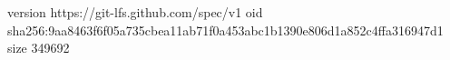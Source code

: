 version https://git-lfs.github.com/spec/v1
oid sha256:9aa8463f6f05a735cbea11ab71f0a453abc1b1390e806d1a852c4ffa316947d1
size 349692
